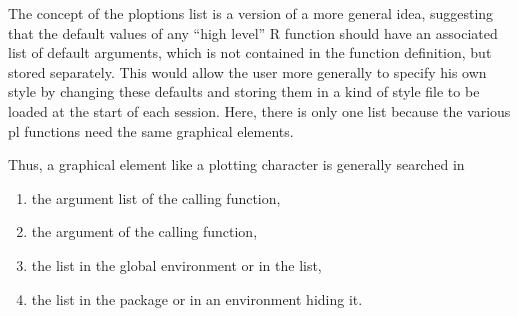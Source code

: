 \documentclass[11pt]{article}\usepackage[]{graphicx}\usepackage[]{color}
\begin{document}
\Remark
The concept of the ploptions list is a version of a more general idea, 
suggesting that the default values of any ``high level'' R function should 
have an associated list of default arguments, which is not contained in 
the function definition, but stored separately. 
This would allow the user more generally to specify his own style by 
changing these defaults and storing them in a kind of style file to be 
loaded at the start of each session. 
Here, there is only one list because the various pl functions need the 
same graphical elements.

Thus, a graphical element like a plotting character is generally searched 
in
\begin{enumerate}
\item 
  the argument list of the calling function,
\item
  the  argument of the calling function,
\item
  the  list in the global environment or in the  list,
\item
  the list  in the package 
  or in an environment hiding it.
\end{enumerate}
\end{document}

